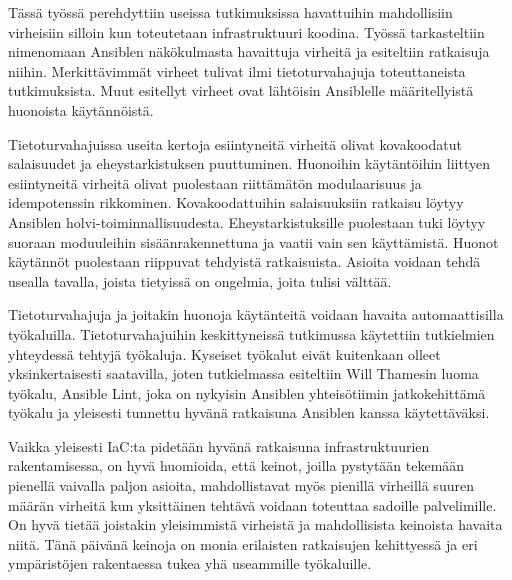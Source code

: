 Tässä työssä perehdyttiin useissa tutkimuksissa havattuihin mahdollisiin
virheisiin silloin kun toteutetaan infrastruktuuri koodina. Työssä tarkasteltiin
nimenomaan Ansiblen näkökulmasta havaittuja virheitä ja esiteltiin ratkaisuja
niihin. Merkittävimmät virheet tulivat ilmi tietoturvahajuja toteuttaneista
tutkimuksista. Muut esitellyt virheet ovat lähtöisin Ansiblelle määritellyistä
huonoista käytännöistä.

Tietoturvahajuissa useita kertoja esiintyneitä virheitä olivat kovakoodatut
salaisuudet ja eheystarkistuksen puuttuminen. Huonoihin käytäntöihin liittyen
esiintyneitä virheitä olivat puolestaan riittämätön modulaarisuus ja
idempotenssin rikkominen. Kovakoodattuihin salaisuuksiin ratkaisu löytyy
Ansiblen holvi-toiminnallisuudesta. Eheystarkistuksille puolestaan tuki
löytyy suoraan moduuleihin sisäänrakennettuna ja vaatii vain sen käyttämistä.
Huonot käytännöt puolestaan riippuvat tehdyistä ratkaisuista. Asioita
voidaan tehdä usealla tavalla, joista tietyissä on ongelmia, joita tulisi välttää.

Tietoturvahajuja ja joitakin huonoja käytänteitä voidaan havaita
automaattisilla työkaluilla. Tietoturvahajuihin keskittyneissä tutkimussa
käytettiin tutkielmien yhteydessä tehtyjä työkaluja. Kyseiset työkalut eivät
kuitenkaan olleet yksinkertaisesti saatavilla, joten tutkielmassa esiteltiin
Will Thamesin luoma työkalu, Ansible Lint, joka on nykyisin Ansiblen yhteisötiimin
jatkokehittämä työkalu ja yleisesti tunnettu hyvänä ratkaisuna Ansiblen kanssa
käytettäväksi.

Vaikka yleisesti IaC:ta pidetään hyvänä ratkaisuna infrastruktuurien
rakentamisessa, on hyvä huomioida, että keinot, joilla pystytään tekemään
pienellä vaivalla paljon asioita, mahdollistavat myös pienillä virheillä
suuren määrän virheitä kun yksittäinen tehtävä voidaan toteuttaa sadoille
palvelimille. On hyvä tietää joistakin yleisimmistä virheistä ja mahdollisista
keinoista havaita niitä. Tänä päivänä keinoja on monia erilaisten ratkaisujen
kehittyessä ja eri ympäristöjen rakentaessa tukea yhä useammille työkaluille.
